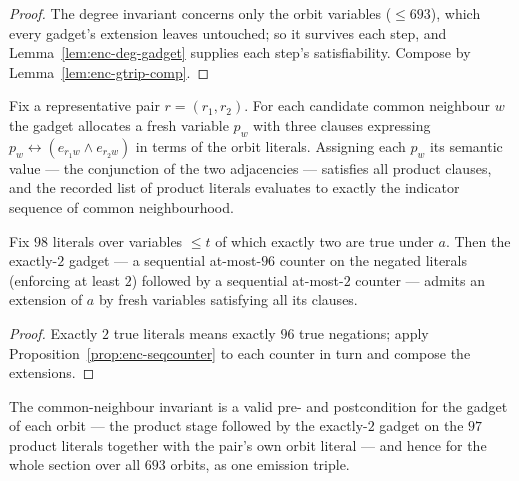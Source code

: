 \begin{proof}\leanok
The degree invariant concerns only the orbit variables ($\leq 693$), which
every gadget's extension leaves untouched; so it survives each step, and
Lemma~\ref{lem:enc-deg-gadget} supplies each step's satisfiability.  Compose
by Lemma~\ref{lem:enc-gtrip-comp}.
\end{proof}

\begin{lemma}\label{lem:enc-cn-product}
Fix a representative pair $r = (r_1,r_2)$.  For each candidate common
neighbour $w$ the gadget allocates a fresh variable $p_w$ with three clauses
expressing $p_w \leftrightarrow (e_{r_1 w} \wedge e_{r_2 w})$ in terms of the
orbit literals.  Assigning each $p_w$ its semantic value --- the conjunction
of the two adjacencies --- satisfies all product clauses, and the recorded
list of product literals evaluates to exactly the indicator sequence of
common neighbourhood.
\leanok
{}
\end{lemma}

\begin{lemma}\label{lem:enc-cn-equals}
Fix $98$ literals over variables $\leq t$ of which exactly two are true
under $a$.  Then the exactly-$2$ gadget --- a sequential at-most-$96$
counter on the negated literals (enforcing at least $2$) followed by a
sequential at-most-$2$ counter --- admits an extension of $a$ by fresh
variables satisfying all its clauses.
\leanok
{}
\end{lemma}

\begin{proof}\leanok
Exactly $2$ true literals means exactly $96$ true negations; apply
Proposition~\ref{prop:enc-seqcounter} to each counter in turn and compose
the extensions.
\end{proof}

\begin{proposition}\label{prop:enc-cn-section}
The common-neighbour invariant is a valid pre- and postcondition for the
gadget of each orbit --- the product stage followed by the exactly-$2$
gadget on the $97$ product literals together with the pair's own orbit
literal --- and hence for the whole section over all $693$ orbits, as one
emission triple.
\leanok
{}
\end{proposition}

